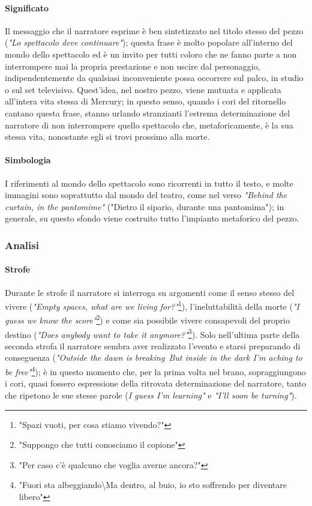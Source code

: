 \documentclass[12pt]{article}
\begin{document}
\paragraph{Significato}
Il messaggio che il narratore esprime è ben sintetizzato nel titolo stesso del pezzo (\emph{"Lo spettacolo deve continuare"}); questa frase è molto popolare all'interno del mondo dello spettacolo ed è un invito per tutti coloro che ne fanno parte a non interrompere mai la propria prestazione e non uscire dal personaggio, indipendentemente da qualsiasi inconveniente possa occorrere sul palco, in studio o sul set televisivo. Quest'idea, nel nostro pezzo, viene mutuata e applicata all'intera vita stessa di Mercury; in questo senso, quando i cori del ritornello cantano questa frase, stanno urlando stranzianti l'estrema determinazione del narratore di non interrompere quello spettacolo che, metaforicamente, è la sua stessa vita, nonostante egli si trovi prossimo alla morte.

\paragraph{Simbologia}
I riferimenti al mondo dello spettacolo sono ricorrenti in tutto il testo, e molte immagini sono soprattutto dal mondo del teatro, come nel verso \emph{"Behind the curtain, in the pantomime"} ("Dietro il sipario, durante una pantomima"); in generale, su questo sfondo viene costruito tutto l'impianto metaforico del pezzo.

\subsubsection{Analisi}
\paragraph{Strofe}
Durante le strofe il narratore si interroga su argomenti come il senso stesso del vivere (\emph{"Empty spaces, what are we living for?"}\footnote{"Spazi vuoti, per cosa stiamo vivendo?"}), l'ineluttabilità della morte (\emph{"I guess we know the score"}\footnote{"Suppongo che tutti conosciamo il copione"}) e come sia possibile vivere consapevoli del proprio destino (\emph{"Does anybody want to take it anymore?"}\footnote{"Per caso c'è qualcuno che voglia averne ancora?"}). Solo nell'ultima parte della seconda strofa il narratore sembra aver realizzato l'evento e starsi preparando di conseguenza (\emph{"Outside the dawn is breaking\ But inside in the dark I'm aching to be free"}\footnote{"Fuori sta albeggiando\textbackslash Ma dentro, al buio, io sto soffrendo per diventare libero"}); è in questo momento che, per la prima volta nel brano, sopraggiungono i cori, quasi fossero espressione della ritrovata determinazione del narratore, tanto che ripetono le sue stesse parole (\emph{I guess I'm learning"} e \emph{"I'll soon be turning"}).
\end{document}
